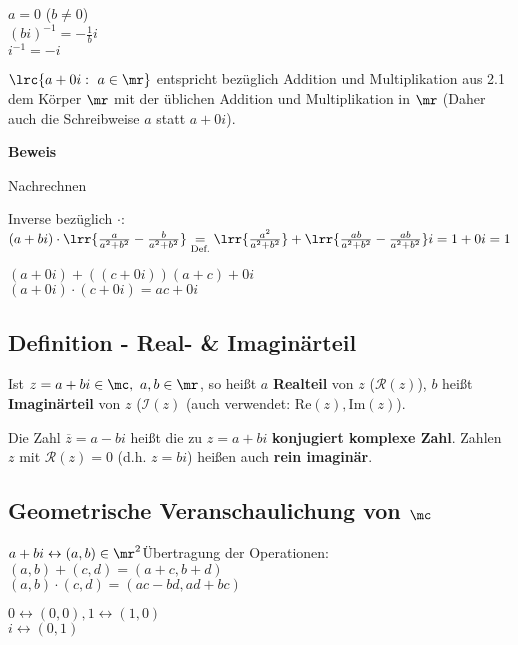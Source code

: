 		$a=0$ ($b\neq 0$)\\
		$(bi)^{-1}=-\frac{1}{b}i$\\
		$i^{-1}=-i$
		\item $\lrc{a+0i:\ a\in\mr}$ entspricht bezüglich Addition und Multiplikation aus 2.1 dem Körper $\mr$ mit der üblichen Addition und Multiplikation in $\mr$ (Daher auch die Schreibweise $a$ statt $a+0i$).
	\subExEnd
	
	\textbf{Beweis}
		\item Nachrechnen
		\item Inverse bezüglich $\cdot$:\\
		$(a+bi)\cdot\lrr{\frac{a}{a^2+b^2}-\frac{b}{a^2+b^2}}\underset{\mbox{\scriptsize Def.}}{=}\lrr{\frac{a^2}{a^2+b^2}}+\lrr{\frac{ab}{a^2+b^2}-\frac{ab}{a^2+b^2}}i=1+0i=1$
		\item $(a+0i)+((c+0i))(a+c)+0i$\\
		$(a+0i)\cdot(c+0i)=ac+0i$
	\subExEnd
	
\subsection{Definition - Real- \& Imaginärteil}
	Ist $z=a+bi\in\mc,\ a,b\in\mr$, so heißt $a$ \textbf{Realteil} von $z$ ($\mathcal{R}(z)$), $b$ heißt \textbf{Imaginärteil} von $z$ ($\mathcal{I}(z)$ (auch verwendet: $\mbox{Re}(z),\mbox{Im}(z)$).
	
	Die Zahl $\overline{z}=a-bi$ heißt die zu $z=a+bi$ \textbf{konjugiert komplexe Zahl}. Zahlen $z$ mit $\mathcal{R}(z)=0$ (d.h. $z=bi$) heißen auch \textbf{rein imaginär}.
	
\subsection{Geometrische Veranschaulichung von \texorpdfstring{$\mc$}{C}}
	$a+bi\leftrightarrow(a,b)\in\mr^2$\quad Übertragung der Operationen:\\
	$(a,b)+(c,d)=(a+c,b+d)$\\
	$(a,b)\cdot(c,d)=(ac-bd,ad+bc)$
	
	$0\leftrightarrow(0,0), 1\leftrightarrow(1,0)$\\
	$i\leftrightarrow(0,1)$
	
